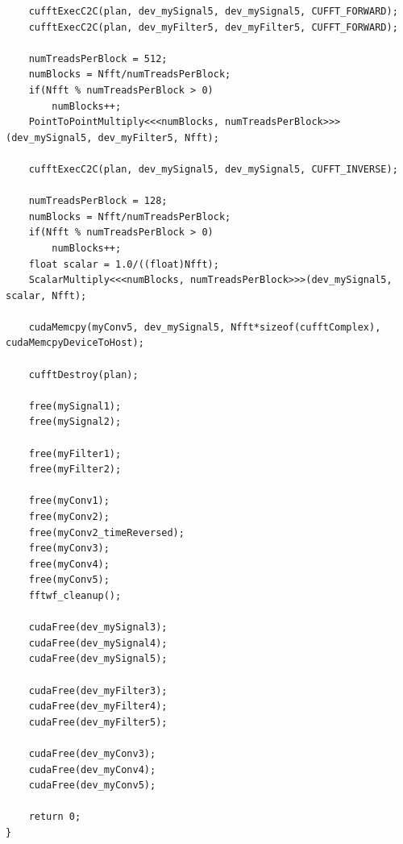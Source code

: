 \begin{lstlisting}
	cufftExecC2C(plan, dev_mySignal5, dev_mySignal5, CUFFT_FORWARD);
	cufftExecC2C(plan, dev_myFilter5, dev_myFilter5, CUFFT_FORWARD);

	numTreadsPerBlock = 512;
	numBlocks = Nfft/numTreadsPerBlock;
	if(Nfft % numTreadsPerBlock > 0)
		numBlocks++;
	PointToPointMultiply<<<numBlocks, numTreadsPerBlock>>>(dev_mySignal5, dev_myFilter5, Nfft);

	cufftExecC2C(plan, dev_mySignal5, dev_mySignal5, CUFFT_INVERSE);

	numTreadsPerBlock = 128;
	numBlocks = Nfft/numTreadsPerBlock;
	if(Nfft % numTreadsPerBlock > 0)
		numBlocks++;
	float scalar = 1.0/((float)Nfft);
	ScalarMultiply<<<numBlocks, numTreadsPerBlock>>>(dev_mySignal5, scalar, Nfft);

	cudaMemcpy(myConv5, dev_mySignal5, Nfft*sizeof(cufftComplex), cudaMemcpyDeviceToHost);

	cufftDestroy(plan);

	free(mySignal1);
	free(mySignal2);

	free(myFilter1);
	free(myFilter2);

	free(myConv1);
	free(myConv2);
	free(myConv2_timeReversed);
	free(myConv3);
	free(myConv4);
	free(myConv5);
	fftwf_cleanup();

	cudaFree(dev_mySignal3);
	cudaFree(dev_mySignal4);
	cudaFree(dev_mySignal5);

	cudaFree(dev_myFilter3);
	cudaFree(dev_myFilter4);
	cudaFree(dev_myFilter5);

	cudaFree(dev_myConv3);
	cudaFree(dev_myConv4);
	cudaFree(dev_myConv5);

	return 0;
}
\end{lstlisting}
\doublespacing